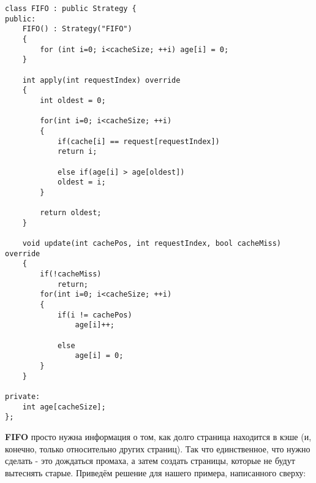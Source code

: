\begin{tcolorbox}
\begin{verbatim}
class FIFO : public Strategy {
public:
    FIFO() : Strategy("FIFO")
    {
        for (int i=0; i<cacheSize; ++i) age[i] = 0;
    }
    
    int apply(int requestIndex) override
    {
        int oldest = 0;
        
        for(int i=0; i<cacheSize; ++i)
        {
            if(cache[i] == request[requestIndex])
            return i;
            
            else if(age[i] > age[oldest])
            oldest = i;
        }
        
        return oldest;
    }
    
    void update(int cachePos, int requestIndex, bool cacheMiss) override
    {
        if(!cacheMiss)
            return;
        for(int i=0; i<cacheSize; ++i)
        {
            if(i != cachePos)
                age[i]++;
            
            else
                age[i] = 0;
        }
    }

private:
    int age[cacheSize];
};
\end{verbatim}
\end{tcolorbox}

\textbf{FIFO} просто нужна информация о том, как долго страница находится в кэше (и, конечно, только относительно других страниц). Так что единственное, что нужно сделать - это дождаться промаха, а затем создать страницы, которые не будут вытеснять старые. Приведём решение для нашего примера, написанного сверху:


